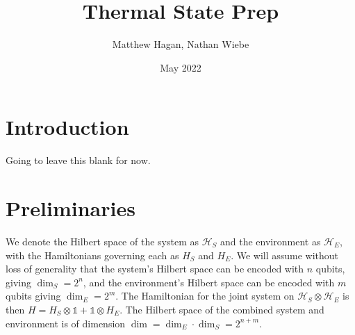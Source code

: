 \documentclass{article}
\title{Thermal State Prep}
\author{Matthew Hagan, Nathan Wiebe}
\date{May 2022}
\newcommand{\hilb}{\mathcal{H}}
\newcommand{\identity}{\mathds{1}}
\begin{document}
\maketitle

\section{Introduction}
Going to leave this blank for now. \cite{shiraishi_undecidability_2021}

\section{Preliminaries}
We denote the Hilbert space of the system as $\hilb_{S}$ and the environment as $\hilb_{E}$, with the Hamiltonians governing each as $H_{S}$ and $H_{E}$. We will assume without loss of generality that the system's Hilbert space can be encoded with $n$ qubits, giving $\dim_S = 2^{n}$, and the environment's Hilbert space can be encoded with $m$ qubits giving $\dim_E = 2^{m}$. The Hamiltonian for the joint system on $\hilb_{S} \otimes \hilb_{E}$ is then $H = H_{S} \otimes \identity + \identity \otimes H_{E}$. The Hilbert space of the combined system and environment is of dimension $\dim = \dim_E \cdot \dim_S = 2^{n + m}$. 
\end{document}
